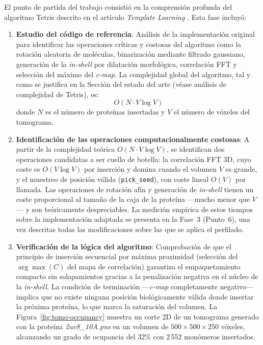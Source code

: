 El punto de partida del trabajo consistió en la comprensión profunda del algoritmo Tetris descrito en el artículo \textit{Template Learning} \cite{harastani2025template}. Esta fase incluyó:

\begin{enumerate}
    \item \textbf{Estudio del código de referencia}: Análisis de la implementación original para identificar las operaciones críticas y costosas del algoritmo como la rotación aleatoria de moléculas, binarización mediante filtrado gaussiano, generación de la \textit{in-shell} por dilatación morfológica, correlación FFT y selección del máximo del \textit{c-map}. La complejidad global del algoritmo, tal y como se justifica en la Sección del estado del arte (véase análisis de complejidad de Tetris), es:
    \begin{equation}
        O(N \cdot V \log V)
    \end{equation}
    donde $N$ es el número de proteínas insertadas y $V$ el número de vóxeles del tomograma. 

    \item \textbf{Identificación de las operaciones computacionalmente costosas}: A partir de la complejidad teórica $O(N \cdot V \log V)$, se identifican dos operaciones candidatas a ser cuello de botella: la correlación FFT 3D, cuyo coste es $O(V \log V)$ por inserción y domina cuando el volumen $V$ es grande, y el muestreo de posición válida (\texttt{pick\_seed}), con coste lineal $O(V)$ por llamada. Las operaciones de rotación afín y generación de \textit{in-shell} tienen un coste proporcional al tamaño de la caja de la proteína —mucho menor que $V$— y son teóricamente despreciables. La medición empírica de estos tiempos sobre la implementación adaptada se presenta en la Fase~3 (Punto~6), una vez descritas todas las modificaciones sobre las que se aplica el perfilado.

    \item \textbf{Verificación de la lógica del algoritmo}: Comprobación de que el principio de inserción secuencial por máxima proximidad (selección del $\arg\max(C)$ del mapa de correlación) garantiza el empaquetamiento compacto sin solapamientos gracias a la penalización negativa en el núcleo de la \textit{in-shell}. La condición de terminación —\textit{c-map} completamente negativo— implica que no existe ninguna posición biológicamente válida donde insertar la próxima proteína, lo que marca la saturación del volumen. La Figura~\ref{fig:tomo-occupancy} muestra un corte 2D de un tomograma generado con la proteína \textit{2uv8\_10A.pns} en un volumen de $500\times500\times250$ vóxeles, alcanzando un grado de ocupancia del 32\% con 2\,552 monómeros insertados.


\end{enumerate}
